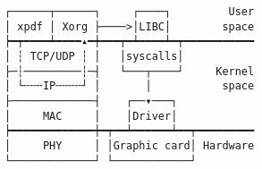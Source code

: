\documentclass[varwidth,crop]{standalone}
\begin{document}
\begin{verbatim}
┌──────┬──────┐     ┌────┐         User
│ xpdf │ Xorg ├────>│LIBC│        space
┝━┯━━━━┷━━━━▴━┿━━━┯━┷━━━━┷━┯━━━━━━━━━━━
│ ┆ TCP/UDP ┆ │   │syscalls│
├─┆─────────┆─┤   └───┬────┘     Kernel
│ └╌╌╌IP╌╌╌╌┘ │       │           space
├─────────────┤    ┌──▾───┐
│     MAC     │    │Driver│
┝━━━━━━━━━━━━━┿━┯━━┷━━━━━━┷━━┯━━━━━━━━━
│     PHY     │ │Graphic card│ Hardware
└─────────────┘ └────────────┘
\end{verbatim}
\end{document}
